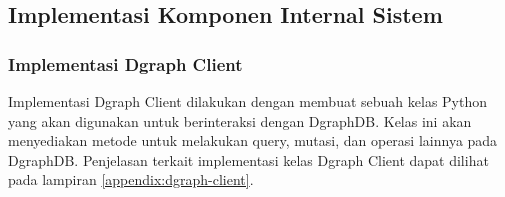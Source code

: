 


      

\subsection{Implementasi Komponen Internal Sistem}

\subsubsection{Implementasi Dgraph Client}

Implementasi Dgraph Client dilakukan dengan membuat sebuah kelas Python yang akan digunakan untuk berinteraksi dengan DgraphDB. Kelas ini akan menyediakan metode untuk melakukan query, mutasi, dan operasi lainnya pada DgraphDB. Penjelasan terkait implementasi kelas Dgraph Client dapat dilihat pada lampiran \ref{appendix:dgraph-client}.

